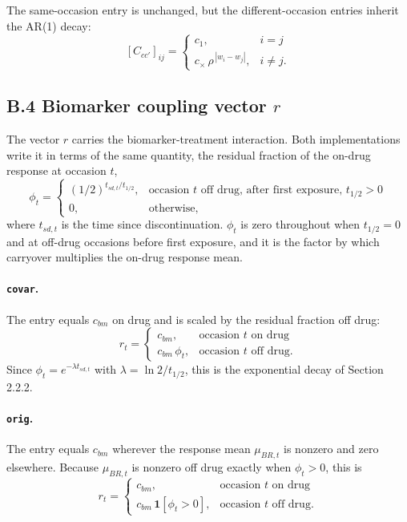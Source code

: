 \documentclass[
  11pt,
]{article}
\begin{document}
The same-occasion entry is unchanged, but
the different-occasion entries inherit the AR(1) decay:
\[
[C_{cc'}]_{ij} =
\begin{cases}
c_1, & i = j\\
c_{\times}\,\rho^{\,|w_i - w_j|}, & i \neq j .
\end{cases}
\]

\subsection{B.4 Biomarker coupling vector $r$}

The vector \(r\) carries the biomarker-treatment interaction. Both
implementations write it in terms of the same quantity, the residual
fraction of the on-drug response at occasion \(t\),
\[
\phi_t =
\begin{cases}
(1/2)^{t_{sd,t}/t_{1/2}}, & \text{occasion } t \text{ off drug, after
  first exposure, } t_{1/2} > 0\\
0, & \text{otherwise},
\end{cases}
\]
where \(t_{sd,t}\) is the time since discontinuation. \(\phi_t\) is zero
throughout when \(t_{1/2} = 0\) and at off-drug occasions before first
exposure, and it is the factor by which carryover multiplies the
on-drug response mean.

\paragraph{\texttt{covar}.}

The entry equals \(c_{bm}\) on drug and is
scaled by the residual fraction off drug:
\[
r_t =
\begin{cases}
c_{bm}, & \text{occasion } t \text{ on drug}\\
c_{bm}\,\phi_t, & \text{occasion } t \text{ off drug} .
\end{cases}
\]
Since \(\phi_t = e^{-\lambda t_{sd,t}}\) with \(\lambda = \ln 2 /
t_{1/2}\), this is the exponential decay of Section 2.2.2.

\paragraph{\texttt{orig}.}

The entry equals \(c_{bm}\) wherever the
response mean \(\mu_{BR,t}\) is nonzero and zero elsewhere. Because
\(\mu_{BR,t}\) is nonzero off drug exactly when \(\phi_t > 0\), this is
\[
r_t =
\begin{cases}
c_{bm}, & \text{occasion } t \text{ on drug}\\
c_{bm}\,\mathbf{1}[\phi_t > 0], & \text{occasion } t \text{ off drug} .
\end{cases}
\]
\end{document}
